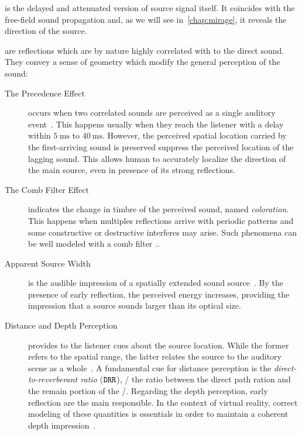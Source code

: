  is the delayed and attenuated version of source signal itself.
It coincides with the free-field sound propagation and, as we will see in~\cref{chap:mirage}, it reveals the direction of the source.

 are reflections which are by nature highly correlated with to the direct sound.
They convey a sense of geometry which modify the general perception of the sound:
\begin{description}
    \item[The Precedence Effect] occurs when two correlated sounds are perceived as a single auditory event~\cite{wallach1973precedence}.
    This happens usually when they reach the listener with a delay within $\SI{5}{\ms}$ to $\SI{40}{\ms}$.
    However, the perceived spatial location carried by the first-arriving sound is preserved suppress the perceived location of the lagging sound.
    This allows human to accurately localize the direction of the main source, even in presence of its strong reflections.
    \item[The Comb Filter Effect] indicates the change in timbre of the perceived sound, named \textit{coloration}.
    This happens when multiples reflections arrive with periodic patterns and some constructive or destructive interferes may arise.
    Such phenomena can be well modeled with a comb filter \cite{barron1971subjective}..
    \item[Apparent Source Width] is the audible impression of a spatially extended sound source~\cite{griesinger1997psychoacoustics}.
    By the presence of early reflection, the perceived energy increases, providing the impression that a source sounds larger than its optical size.
    \item[Distance and Depth Perception] provides to the listener cues about the source location.
    While the former refers to the spatial range, the latter relates the source to the auditory scene as a whole~\cite{kearney2012distance}.
    A fundamental cue for distance perception is the \textit{direct-to-reverberant ratio} ($\mathtt{DRR}$),
    \ie/ the ratio between the direct path ration and the remain portion of the \RIR/.
    Regarding the depth perception, early reflection are the main responsible.
    In the context of virtual reality, correct modeling of these quantities is essentials in order to maintain a coherent depth impression~\cite{kearney2012distance}.
\end{description}

